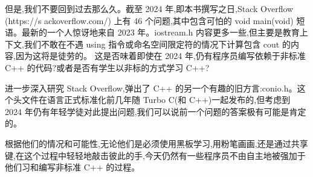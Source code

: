 但是,我们不要回到过去那么久。截至 2024 年,即本书撰写之日,Stack Overflow (https://s ackoverflow.com/) 上有 46 个问题,其中包含可怕的 void main(void) 短语。最新的一个人惊讶地来自 2023 年。iostream.h 内容更多一些,但主要是教育上下文,我们不敢在不遇 using 指令或命名空间限定符的情况下计算包含 cout 的内容,因为这将是徒劳的。 这是否味着即使在 2024 年,仍有程序员编写依赖于非标准 C++ 的代码?或者是否有学生以非标的方式学习 C++? 

进一步深入研究 Stack Overflow,弹出了 C++ 的另一个有趣的旧方言:conio.h。这个头文件在语言正式标准化前几年随 Turbo C(和 C++)一起发布的,但考虑到 2024 年仍有年轻学徒对此提出问题,我们可以说前一个问题的答案极有可能是肯定的。

根据他们的情况和可能性,无论他们是必须使用黑板学习,用粉笔画画,还是通过共享键,在这个过程中轻轻地敲击彼此的手,今天仍然有一些程序员不由自主地被强加于他们习和编写非标准 C++ 的过程。